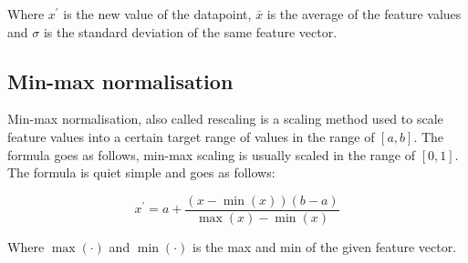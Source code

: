 \documentclass[../main.tex]{subfiles}
\begin{document}
Where $x^{\prime}$ is the new value of the datapoint, $\bar{x}$ is the average of the feature values and $\sigma$ is the standard deviation of the same feature vector.

\subsection{Min-max normalisation}
Min-max normalisation, also called rescaling is a scaling method used to scale feature values into a certain target range of values in the range of $[a,b]$. The formula goes as follows, min-max scaling is usually scaled in the range of $[0,1]$. The formula is quiet simple and goes as follows:

\begin{equation*}
x^{\prime}=a+\frac{(x-\min (x))(b-a)}{\max (x)-\min (x)}
\end{equation*}

Where $\max(\cdot)$ and $\min(\cdot)$ is the max and min of the given feature vector.
\end{document}
